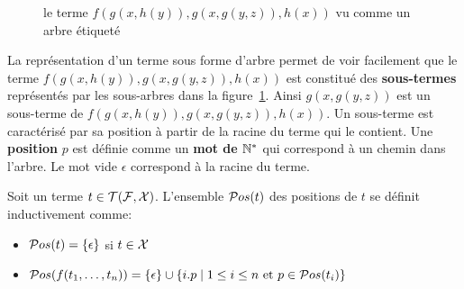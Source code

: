 \begin{figure}[ht!]
  \centering
  \caption{\footnotesize le terme $f(g(x,h(y)), g(x, g(y, z)), h(x))$ vu comme un arbre étiqueté}
  \label{fig:terme-arbre}
\end{figure}

La représentation d'un terme sous forme d'arbre permet de voir
facilement que le terme $f(g(x,h(y)), g(x, g(y, z)), h(x))$ est constitué des \textbf{sous-termes}
représentés par les sous-arbres dans la figure~\ref{fig:terme-arbre}.
Ainsi $g(x, g(y, z))$ est un sous-terme de $f(g(x,h(y)), g(x, g(y, z)), h(x))$.
Un sous-terme est caractérisé par sa position à partir de la racine du terme
qui le contient. Une \textbf{position} $p$ est définie comme un \textbf{mot de $\mathbb{N}^*$} qui correspond
à un chemin dans l'arbre. Le mot vide $\epsilon$ correspond à la racine du terme.

\begin{definition}
  Soit un terme $t \in \mathcal{T(F, X)}$. L'ensemble $\mathcal{ P}os(t)$ des positions de $t$ se définit inductivement
  comme:
  \begin{itemize}
  \item $\mathcal{ P}os(t)= \{ \epsilon\} $ si $t \in \mathcal X$
  \item $\mathcal{ P}os(f(t_1,\dots,t_n)) = \{ \epsilon \} \cup \{i.p \mid 1 \leq i \leq n
    \mbox{ et } p \in \mathcal{ P}os(t_i) \}$
  \end{itemize}
\end{definition}


